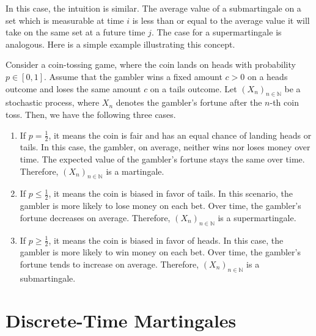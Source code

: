 In this case, the intuition is similar. The average value of a submartingale on a set which is measurable at time $i$ is less than or equal to the average value it will take on the same set at a future time $j$. The case for a supermartingale is analogous. Here is a simple example illustrating this concept.

\begin{example}
Consider a coin-tossing game, where the coin lands on heads with probability $p \in [0,1]$. Assume that the gambler wins a fixed amount $c > 0$ on a heads outcome and loses the same amount $c$ on a tails outcome. Let $(X_n)_{n \in \mathbb{N}}$ be a stochastic process, where $X_n$ denotes the gambler's fortune after the $n$-th coin toss. Then, we have the following three cases.
\begin{enumerate}
\item If $p = \frac{1}{2}$, it means the coin is fair and has an equal chance of landing heads or tails. In this case, the gambler, on average, neither wins nor loses money over time. The expected value of the gambler's fortune stays the same over time. Therefore, $(X_n)_{n \in \mathbb{N}}$ is a martingale. \\
\item If $p \le \frac{1}{2}$, it means the coin is biased in favor of tails. In this scenario, the gambler is more likely to lose money on each bet. Over time, the gambler's fortune decreases on average. Therefore, $(X_n)_{n \in \mathbb{N}}$ is a supermartingale.\\
\item If $p \ge \frac{1}{2}$, it means the coin is biased in favor of heads. In this case, the gambler is more likely to win money on each bet. Over time, the gambler's fortune tends to increase on average. Therefore, $(X_n)_{n \in \mathbb{N}}$ is a submartingale.
\end{enumerate}
\end{example}



\section{Discrete-Time Martingales}
